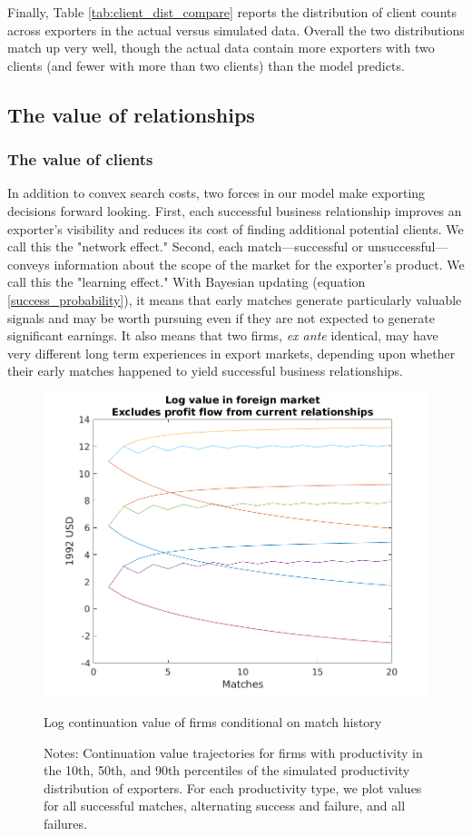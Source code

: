 \documentclass[12pt]{article}
\begin{document}
Finally, Table \ref{tab:client_dist_compare} reports the distribution of
client counts across exporters in the actual versus simulated data. Overall
the two distributions match up very well, though the actual data contain
more exporters with two clients (and fewer with more than two clients) than
the model predicts.


\subsection{The value of relationships}
\label{sec:value_of_rel}
\subsubsection{The value of clients}


In addition to convex search costs, two forces in our model make exporting
decisions forward looking. First, each successful business relationship
improves an exporter's visibility and reduces its cost of finding additional
potential clients. We call this the "network effect." Second, each
match---successful or unsuccessful---conveys information about the scope of
the market for the exporter's product. We call this the "learning effect."
With Bayesian updating (equation \ref{success_probability}), it means that
early matches generate particularly valuable signals and may be worth
pursuing even if they are not expected to generate significant earnings. It
also means that two firms, \textit{ex ante} identical, may have very
different long term experiences in export markets, depending upon whether
their early matches happened to yield successful business relationships.

\begin{figure}
    \centering
    \includegraphics[scale=0.5]{figures/val_f_three_types}
    \caption{Log continuation value of firms conditional on match history}
    \label{fig:val_three_types}
    \caption*{Notes: Continuation value trajectories for firms with productivity in the 10th, 50th, and 90th percentiles of the simulated productivity distribution of exporters.  For each productivity type, we plot values for all successful matches, alternating success and failure, and all failures.}
\end{figure} 
\end{document}
